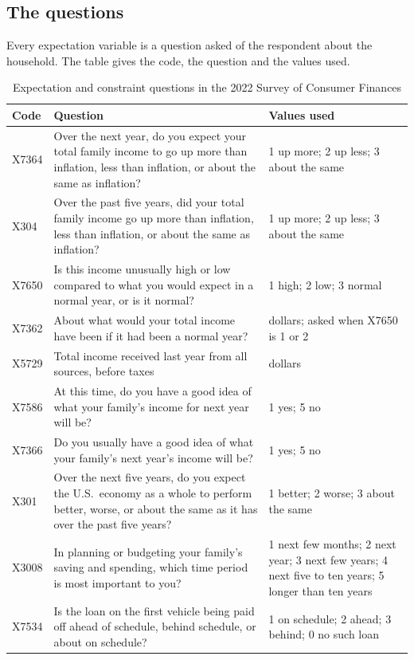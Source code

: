 \subsection{The questions}

Every expectation variable is a question asked of the respondent about the household. The table gives the code, the question and the values used.

\begin{table}[H]
\centering
\caption{Expectation and constraint questions in the 2022 Survey of Consumer Finances}
\label{tab:scf_questions}
\small
\begin{tabular}{p{1.6cm} p{7.6cm} p{5.6cm}}
\toprule
Code & Question & Values used \\
\midrule
X7364 & Over the next year, do you expect your total family income to go up more than inflation, less than inflation, or about the same as inflation? & 1 up more; 2 up less; 3 about the same \\
X304 & Over the past five years, did your total family income go up more than inflation, less than inflation, or about the same as inflation? & 1 up more; 2 up less; 3 about the same \\
X7650 & Is this income unusually high or low compared to what you would expect in a normal year, or is it normal? & 1 high; 2 low; 3 normal \\
X7362 & About what would your total income have been if it had been a normal year? & dollars; asked when X7650 is 1 or 2 \\
X5729 & Total income received last year from all sources, before taxes & dollars \\
X7586 & At this time, do you have a good idea of what your family's income for next year will be? & 1 yes; 5 no \\
X7366 & Do you usually have a good idea of what your family's next year's income will be? & 1 yes; 5 no \\
X301 & Over the next five years, do you expect the U.S.\ economy as a whole to perform better, worse, or about the same as it has over the past five years? & 1 better; 2 worse; 3 about the same \\
X3008 & In planning or budgeting your family's saving and spending, which time period is most important to you? & 1 next few months; 2 next year; 3 next few years; 4 next five to ten years; 5 longer than ten years \\
X7534 & Is the loan on the first vehicle being paid off ahead of schedule, behind schedule, or about on schedule? & 1 on schedule; 2 ahead; 3 behind; 0 no such loan \\

\end{tabular}
\end{table}
